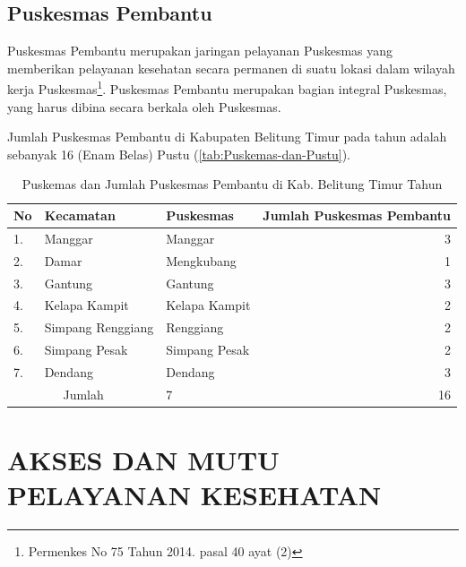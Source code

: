 \subsection{Puskesmas Pembantu}

Puskesmas Pembantu merupakan jaringan pelayanan Puskesmas yang memberikan pelayanan kesehatan secara permanen di suatu lokasi dalam wilayah kerja Puskesmas\footnote{Permenkes No 75 Tahun 2014. pasal 40 ayat (2)}. Puskesmas  Pembantu merupakan bagian integral  Puskesmas, yang harus dibina secara berkala oleh Puskesmas.

Jumlah Puskesmas Pembantu di Kabupaten Belitung Timur pada tahun \tP adalah sebanyak 16 (Enam Belas) Pustu (\autoref{tab:Puskemas-dan-Pustu}).

\begin{table}[!ht]
\caption{Puskemas dan Jumlah Puskesmas Pembantu di Kab. Belitung Timur Tahun \tP}
\label{tab:Puskemas-dan-Pustu}
\centering{}%

\begin{tabular}{lllr}
	\toprule
    No & Kecamatan & Puskesmas & Jumlah Puskesmas Pembantu\\
    \midrule
	1.                    & Manggar           & Manggar       & 3 \\
	\rowcolor{black!10}2. & Damar             & Mengkubang    & 1 \\
	3.                    & Gantung           & Gantung       & 3 \\
	\rowcolor{black!10}4. & Kelapa Kampit     & Kelapa Kampit & 2 \\
	5.                    & Simpang Renggiang & Renggiang     & 2 \\
	\rowcolor{black!10}6. & Simpang Pesak     & Simpang Pesak & 2 \\
	7.                    & Dendang           & Dendang       & 3 \\
    \midrule
    \multicolumn{2}{c}{Jumlah}                & 7             & 16\\
    \bottomrule
\end{tabular}
\end{table}

\section{AKSES DAN MUTU PELAYANAN KESEHATAN}
